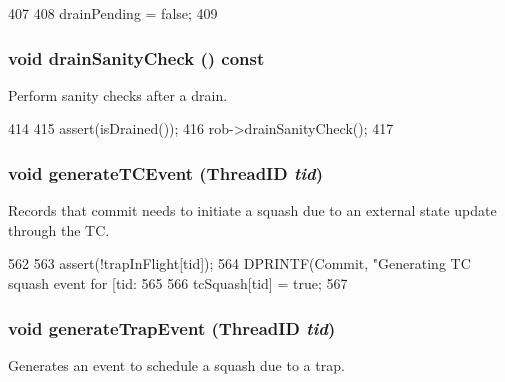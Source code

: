 \begin{DoxyCode}
407 {
408     drainPending = false;
409 }
\end{DoxyCode}
\hypertarget{classDefaultCommit_a0240eb42fa57fe5d3788093f62b77347}{
\subsubsection[{drainSanityCheck}]{\setlength{\rightskip}{0pt plus 5cm}void drainSanityCheck () const}}
\label{classDefaultCommit_a0240eb42fa57fe5d3788093f62b77347}
Perform sanity checks after a drain. 


\begin{DoxyCode}
414 {
415     assert(isDrained());
416     rob->drainSanityCheck();
417 }
\end{DoxyCode}
\hypertarget{classDefaultCommit_a4adb99d6e22b7028a21e537331de6253}{
\subsubsection[{generateTCEvent}]{\setlength{\rightskip}{0pt plus 5cm}void generateTCEvent ({\bf ThreadID} {\em tid})}}
\label{classDefaultCommit_a4adb99d6e22b7028a21e537331de6253}
Records that commit needs to initiate a squash due to an external state update through the TC. 


\begin{DoxyCode}
562 {
563     assert(!trapInFlight[tid]);
564     DPRINTF(Commit, "Generating TC squash event for [tid:%
565 
566     tcSquash[tid] = true;
567 }
\end{DoxyCode}
\hypertarget{classDefaultCommit_a7002d0f2beae1ce9a349218968ff97c3}{
\subsubsection[{generateTrapEvent}]{\setlength{\rightskip}{0pt plus 5cm}void generateTrapEvent ({\bf ThreadID} {\em tid})}}
\label{classDefaultCommit_a7002d0f2beae1ce9a349218968ff97c3}
Generates an event to schedule a squash due to a trap. 


